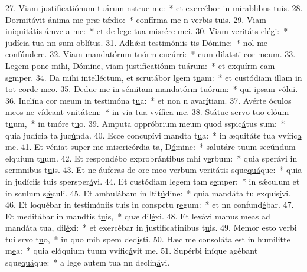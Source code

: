 27. Viam justificatiónum tuárum nstru\uline{e} me:~* et exercébor in mirablibus t\uline{u}is.
28. Dormitávit ánima me præ t\uline{ǽ}dio:~* confírma me n verbis t\uline{u}is.
29. Viam iniquitátis ámve \uline{a} me:~* et de lege tua misrére m\uline{e}i.
30. Viam veritáts el\uline{é}gi:~* judícia tua nn sum obl\uline{í}tus.
31. Adhǽsi testimóniis tis D\uline{ó}mine:~* nol me conf\uline{ú}ndere.
32. Viam mandatórum tuórm cuc\uline{ú}rri:~* cum dilatsti cor m\uline{e}um.
33. Legem pone mihi, Dómine, viam justificatiónm tu\uline{á}rum:~* et exquírm eam s\uline{e}mper.
34. Da mihi intelléctum, et scrutábor lgem t\uline{u}am:~* et custódiam illam in tot corde m\uline{e}o.
35. Deduc me in sémitam mandatórm tu\uline{ó}rum:~* qui ipsam v\uline{ó}lui.
36. Inclína cor meum in testimóna t\uline{u}a:~* et non n avar\uline{í}tiam.
37. Avérte óculos meos ne vídeant vnit\uline{á}tem:~* in via tua vvífic\uline{a} me.
38. Státue servo tuo elóum t\uline{u}um,~* in tmóre t\uline{u}o.
39. Amputa oppróbrium meum quod sspic\uline{á}tus sum:~* quia judícia ta juc\uline{ú}nda.
40. Ecce concupívi mandta t\uline{u}a:~* in æquitáte tua vvífic\uline{a} me.
41. Et véniat super me misericórdia ta, D\uline{ó}mine:~* salutáre tuum secúndum elquium t\uline{u}um.
42. Et respondébo exprobrántibus mhi v\uline{e}rbum:~* quia sperávi in sermnibus t\uline{u}is.
43. Et ne áuferas de ore meo verbum veritátis sque\uline{quá}que:~* quia in judíciis tuis spersper\uline{á}vi.
44. Et custódiam legem tam s\uline{e}mper:~* in sǽculum et in sculum s\uline{ǽ}culi.
45. Et ambulábam in ltit\uline{ú}dine:~* quia mandáta tu exquis\uline{í}vi.
46. Et loquébar in testimóniis tuis in conspctu r\uline{e}gum:~* et nn confund\uline{é}bar.
47. Et meditábar in mandtis t\uline{u}is,~* quæ dil\uline{é}xi.
48. Et levávi manus meas ad mandáta tua,  dil\uline{é}xi:~* et exercébar in justificatinibus t\uline{u}is.
49. Memor esto verbi tui srvo t\uline{u}o,~* in quo mih spem ded\uline{í}sti.
50. Hæc me consoláta est in humilitte m\uline{e}a:~* quia elóquium tuum vvific\uline{á}vit me.
51. Supérbi iníque agébant sque\uline{quá}que:~* a lege autem tua nn declin\uline{á}vi.
